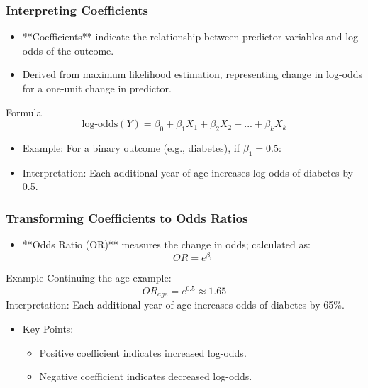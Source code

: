 \documentclass[aspectratio=169]{beamer}
\begin{document}
\begin{frame}[fragile]
    \frametitle{Interpreting Coefficients}
    \begin{itemize}
        \item **Coefficients** indicate the relationship between predictor variables and log-odds of the outcome.
        \item Derived from maximum likelihood estimation, representing change in log-odds for a one-unit change in predictor.
    \end{itemize}
    
    \begin{block}{Formula}
        \begin{equation}
        \text{log-odds}(Y) = \beta_0 + \beta_1 X_1 + \beta_2 X_2 + ... + \beta_k X_k
        \end{equation}
    \end{block}
    
    \begin{itemize}
        \item Example: For a binary outcome (e.g., diabetes), if \( \beta_1 = 0.5 \):
        \item Interpretation: Each additional year of age increases log-odds of diabetes by 0.5.
    \end{itemize}
\end{frame}

\begin{frame}[fragile]
    \frametitle{Transforming Coefficients to Odds Ratios}
    \begin{itemize}
        \item **Odds Ratio (OR)** measures the change in odds; calculated as:
        \begin{equation}
        OR = e^{\beta_i}
        \end{equation}
    \end{itemize}
    
    \begin{block}{Example}
        Continuing the age example:
        \begin{equation}
        OR_{age} = e^{0.5} \approx 1.65
        \end{equation}
        Interpretation: Each additional year of age increases odds of diabetes by 65\%.
    \end{block}
    
    \begin{itemize}
        \item Key Points:
            \begin{itemize}
                \item Positive coefficient indicates increased log-odds.
                \item Negative coefficient indicates decreased log-odds.
            \end{itemize}
    \end{itemize}
\end{frame}
\end{document}
